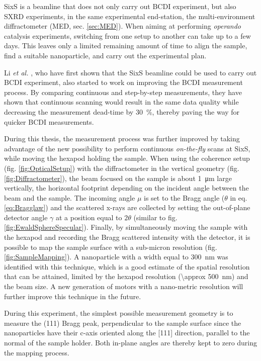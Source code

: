 SixS is a beamline that does not only carry out BCDI experiment, but also SXRD experiments, in the same experimental end-station, the multi-environment diffractometer (MED, sec. \ref{sec:MED}).
When aiming at performing \textit{operando} catalysis experiments, switching from one setup to another can take up to a few days.
This leaves only a limited remaining amount of time to align the sample, find a suitable nanoparticle, and carry out the experimental plan.

Li \textit{et al.} \parencite*{Li2020}, who have first shown that the SixS beamline could be used to carry out BCDI experiment, also started to work on improving the BCDI measurement process.
By comparing continuous and step-by-step measurements, they have shown that continuous scanning would result in the same data quality while decreasing the measurement dead-time by \qty{30}{\percent}, thereby paving the way for quicker BCDI measurements.

During this thesis, the measurement process was further improved by taking advantage of the new possibility to perform continuous \textit{on-the-fly} scans at SixS, while moving the hexapod holding the sample.
When using the coherence setup (fig. \ref{fig:OpticalSetup}) with the diffractometer in the vertical geometry (fig. \ref{fig:Diffractometer}), the beam focused on the sample is about \qty{1}{\um} large vertically, the horizontal footprint depending on the incident angle between the beam and the sample.
The incoming angle $\mu$ is set to the Bragg angle ($\theta$ in eq. \ref{eq:Bragglaw}) and the scattered x-rays are collected by setting the out-of-plane detector angle $\gamma$ at a position equal to $2\theta$ (similar to fig. \ref{fig:EwaldSphereSpecular}).
Finally, by simultaneously moving the sample with the hexapod and recording the Bragg scattered intensity with the detector, it is possible to map the sample surface with a sub-micron resolution (fig. \ref{fig:SampleMapping}).
A nanoparticle with a width equal to \qty{300}{\nm} was identified with this technique, which is a good estimate of the spatial resolution that can be attained, limited by the hexapod resolution (\qty{\approx 500}{\nm}) and the beam size.
A new generation of motors with a nano-metric resolution will further improve this technique in the future.

During this experiment, the simplest possible measurement geometry is to measure the (111) Bragg peak, perpendicular to the sample surface since the nanoparticles have their c-axis oriented along the [111] direction, parallel to the normal of the sample holder.
Both in-plane angles are thereby kept to zero during the mapping process.

